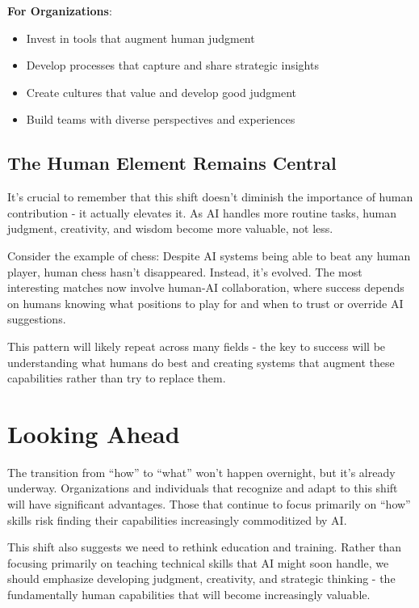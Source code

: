 \documentclass[
  Letterpaper,
]{scrbook}
\providecommand{\tightlist}{%
  \setlength{\itemsep}{0pt}\setlength{\parskip}{0pt}}\usepackage{longtable,booktabs,array}
\begin{document}
\textbf{For Organizations}:

\begin{itemize}
\tightlist
\item
  Invest in tools that augment human judgment
\item
  Develop processes that capture and share strategic insights
\item
  Create cultures that value and develop good judgment
\item
  Build teams with diverse perspectives and experiences
\end{itemize}

\subsection{The Human Element Remains
Central}\label{the-human-element-remains-central}

It's crucial to remember that this shift doesn't diminish the importance
of human contribution - it actually elevates it. As AI handles more
routine tasks, human judgment, creativity, and wisdom become more
valuable, not less.

Consider the example of chess: Despite AI systems being able to beat any
human player, human chess hasn't disappeared. Instead, it's evolved. The
most interesting matches now involve human-AI collaboration, where
success depends on humans knowing what positions to play for and when to
trust or override AI suggestions.

This pattern will likely repeat across many fields - the key to success
will be understanding what humans do best and creating systems that
augment these capabilities rather than try to replace them.

\section{Looking Ahead}\label{looking-ahead-1}

The transition from ``how'' to ``what'' won't happen overnight, but it's
already underway. Organizations and individuals that recognize and adapt
to this shift will have significant advantages. Those that continue to
focus primarily on ``how'' skills risk finding their capabilities
increasingly commoditized by AI.

This shift also suggests we need to rethink education and training.
Rather than focusing primarily on teaching technical skills that AI
might soon handle, we should emphasize developing judgment, creativity,
and strategic thinking - the fundamentally human capabilities that will
become increasingly valuable.
\end{document}
